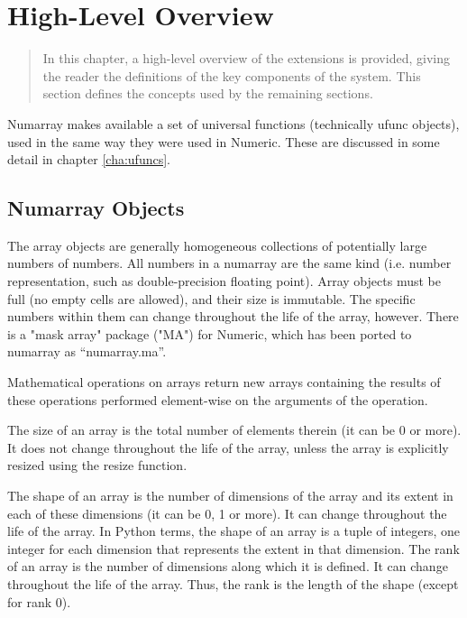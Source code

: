 \chapter{High-Level Overview}
\label{cha:high-level-overview}

\begin{quote} 
   In this chapter, a high-level overview of the extensions is provided, giving
   the reader the definitions of the key components of the system. This section
   defines the concepts used by the remaining sections.
\end{quote}

Numarray makes available a set of universal functions (technically ufunc
objects), used in the same way they were used in Numeric. These are discussed
in some detail in chapter \ref{cha:ufuncs}.


\section{Numarray Objects}
\label{sec:numarray-objects}

The array objects are generally homogeneous collections of potentially large
numbers of numbers. All numbers in a numarray are the same kind (i.e. number
representation, such as double-precision floating point). Array objects must be
full (no empty cells are allowed), and their size is immutable. The specific
numbers within them can change throughout the life of the array, however.
There is a "mask array" package ("MA") for Numeric, which has been ported
to numarray as ``numarray.ma''.

Mathematical operations on arrays return new arrays containing the results of
these operations performed element-wise on the arguments of the operation.

The size of an array is the total number of elements therein (it can be 0 or
more). It does not change throughout the life of the array, unless the array
is explicitly resized using the resize function.

The shape of an array is the number of dimensions of the array and its extent
in each of these dimensions (it can be 0, 1 or more). It can change throughout
the life of the array. In Python terms, the shape of an array is a tuple of
integers, one integer for each dimension that represents the extent in that
dimension.  The rank of an array is the number of dimensions along which it is
defined. It can change throughout the life of the array. Thus, the rank is the
length of the shape (except for rank 0). 

